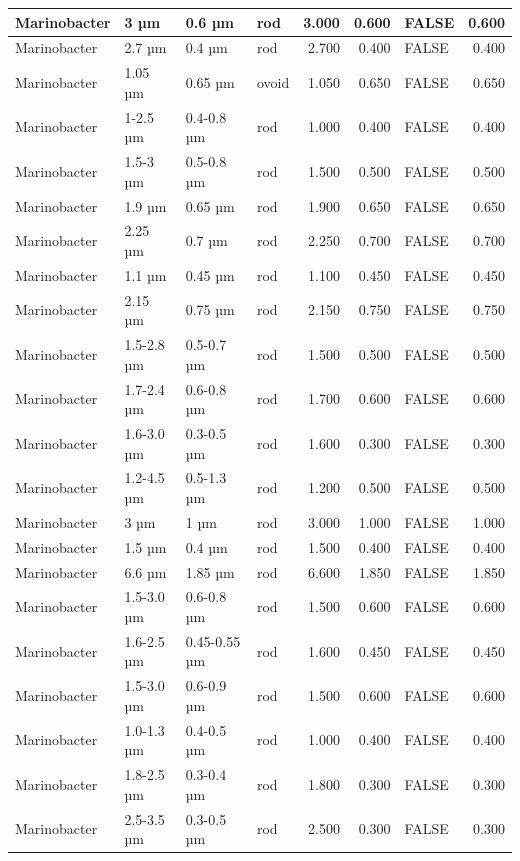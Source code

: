 \documentclass[
]{article}
\begin{document}
\begin{table}
\begin{tabular}{l|l|l|l|r|r|l|r}
\hline
Marinobacter & 3 µm & 0.6 µm & rod & 3.000 & 0.600 & FALSE & 0.600\\
\hline
Marinobacter & 2.7 µm & 0.4 µm & rod & 2.700 & 0.400 & FALSE & 0.400\\
\hline
Marinobacter & 1.05 µm & 0.65 µm & ovoid & 1.050 & 0.650 & FALSE & 0.650\\
\hline
Marinobacter & 1-2.5 µm & 0.4-0.8 µm & rod & 1.000 & 0.400 & FALSE & 0.400\\
\hline
Marinobacter & 1.5-3 µm & 0.5-0.8 µm & rod & 1.500 & 0.500 & FALSE & 0.500\\
\hline
Marinobacter & 1.9 µm & 0.65 µm & rod & 1.900 & 0.650 & FALSE & 0.650\\
\hline
Marinobacter & 2.25 µm & 0.7 µm & rod & 2.250 & 0.700 & FALSE & 0.700\\
\hline
Marinobacter & 1.1 µm & 0.45 µm & rod & 1.100 & 0.450 & FALSE & 0.450\\
\hline
Marinobacter & 2.15 µm & 0.75 µm & rod & 2.150 & 0.750 & FALSE & 0.750\\
\hline
Marinobacter & 1.5-2.8 µm & 0.5-0.7 µm & rod & 1.500 & 0.500 & FALSE & 0.500\\
\hline
Marinobacter & 1.7-2.4 µm & 0.6-0.8 µm & rod & 1.700 & 0.600 & FALSE & 0.600\\
\hline
Marinobacter & 1.6-3.0 µm & 0.3-0.5 µm & rod & 1.600 & 0.300 & FALSE & 0.300\\
\hline
Marinobacter & 1.2-4.5 µm & 0.5-1.3 µm & rod & 1.200 & 0.500 & FALSE & 0.500\\
\hline
Marinobacter & 3 µm & 1 µm & rod & 3.000 & 1.000 & FALSE & 1.000\\
\hline
Marinobacter & 1.5 µm & 0.4 µm & rod & 1.500 & 0.400 & FALSE & 0.400\\
\hline
Marinobacter & 6.6 µm & 1.85 µm & rod & 6.600 & 1.850 & FALSE & 1.850\\
\hline
Marinobacter & 1.5-3.0 µm & 0.6-0.8 µm & rod & 1.500 & 0.600 & FALSE & 0.600\\
\hline
Marinobacter & 1.6-2.5 µm & 0.45-0.55 µm & rod & 1.600 & 0.450 & FALSE & 0.450\\
\hline
Marinobacter & 1.5-3.0 µm & 0.6-0.9 µm & rod & 1.500 & 0.600 & FALSE & 0.600\\
\hline
Marinobacter & 1.0-1.3 µm & 0.4-0.5 µm & rod & 1.000 & 0.400 & FALSE & 0.400\\
\hline
Marinobacter & 1.8-2.5 µm & 0.3-0.4 µm & rod & 1.800 & 0.300 & FALSE & 0.300\\
\hline
Marinobacter & 2.5-3.5 µm & 0.3-0.5 µm & rod & 2.500 & 0.300 & FALSE & 0.300\\

\end{tabular}
\end{table}
\end{document}
